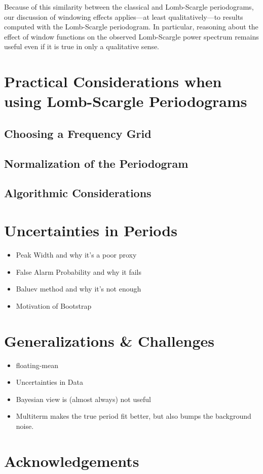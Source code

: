 \documentclass[preprint]{aastex}
\begin{document}
Because of this similarity between the classical and Lomb-Scargle periodograms,
our discussion of windowing effects applies---at least qualitatively---to
results computed with the Lomb-Scargle periodogram.
In particular, reasoning about the effect of window functions on the observed
Lomb-Scargle power spectrum remains useful even if it is true in only a
qualitative sense.


\section{Practical Considerations when using Lomb-Scargle Periodograms}

\subsection{Choosing a Frequency Grid}

\subsection{Normalization of the Periodogram}

\subsection{Algorithmic Considerations}


\section{Uncertainties in Periods}

\begin{itemize}
  \item Peak Width and why it's a poor proxy
  \item False Alarm Probability and why it fails
  \item Baluev method and why it's not enough
  \item Motivation of Bootstrap
\end{itemize}


\section{Generalizations \& Challenges}

\begin{itemize}
\item floating-mean
\item Uncertainties in Data
\item Bayesian view is (almost always) not useful
\item Multiterm makes the true period fit better, but also bumps the background noise.
\end{itemize}


\section{Acknowledgements}

\citet{Astropy2013}



\end{document}
